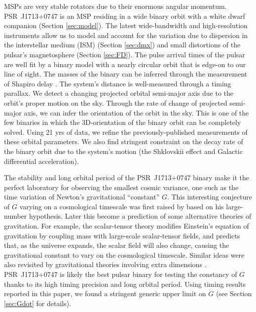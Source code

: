 MSPs are very stable rotators due to their enormous
angular momentum. PSR~J1713+0747 is an MSP residing in a wide binary orbit with a white dwarf companion (Section \ref{sec:model}). 
The latest wide-bandwidth and high-resolution instruments allow us to model
and account for the variation due to dispersion in the interstellar medium (ISM)
(Section \ref{sec:dmx}) and small distortions of the pulsar's magnetosphere (Section \ref{sec:FD}). 
The pulse arrival times of the pulsar are well fit by a binary model with
a nearly circular orbit that is edge-on to our line of sight. The masses of
the binary can be inferred through the measurement of Shapiro delay \citep{sns+05}. 
The system's distance is well-measured through a timing parallax. We detect
a changing projected orbital semi-major axis due to the orbit's proper motion
on the sky. Through the rate of change of projected semi-major axis, we can infer 
the orientation of the orbit in the sky.
This is one of the few binaries in which the 3D-orientation of the
binary orbit can be completely solved. Using 21 yrs of data, we
refine the previously-published measurements of these orbital parameters.
We also find stringent constraint on the decay rate of the binary orbit due to the system's
motion (the Shklovskii effect and Galactic differential acceleration).

The stability and long orbital period of the PSR~J1713+0747 binary make it the
perfect laboratory for observing the smallest cosmic variance, 
one such as the time variation of Newton's gravitational ``constant'' $G$. 
This interesting conjecture of $G$ varying on a cosmological timescale was first 
raised by \citet{dir37} based on his large-number hypothesis. 
Later this become a prediction of some alternative theories of gravitation. 
For example, the scalar-tensor theory \citep{jor55,jor59,fie56,bd61} 
modifies Einstein's equation of gravitation by coupling mass with
large-scale scalar-tensor fields, and predicts that, as the universe expands,
the scalar field will also change, causing the gravitational constant to vary  
on the cosmological timescale. 
Similar ideas were also revisited by gravitational theories involving extra dimensions
\citep{mar84,ww86a}.
PSR~J1713+0747 is likely the best pulsar binary for testing the constancy of
$G$ thanks to its high timing precision and long orbital period. Using timing
results reported in this paper, we found a stringent generic upper limit on 
$\dot{G}$ (see Section \ref{sec:Gdot} for details). 

